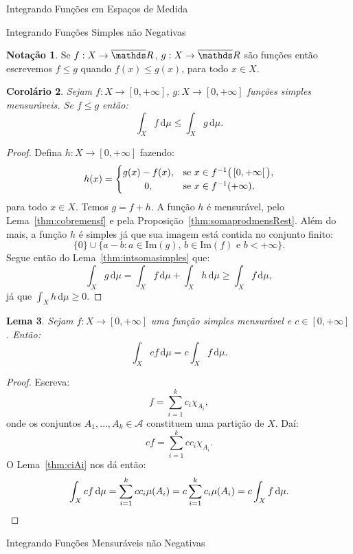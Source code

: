 \documentclass[oneside,final,11pt]{amsbook}
\newcommand{\R}{\mathds R}
\newcommand{\Img}{\mathrm{Im}}
\newcommand{\dd}{\mathrm d}
\theoremstyle{remark}\newtheorem{exercise}{Exercício}[chapter]
\theoremstyle{remark}\newtheorem{*exercise}[exercise]{\hbox to 0pt{\hskip 0pt minus 1fil*}Exercício}
\theoremstyle{definition}\newtheorem{exdefin}{Definição}[chapter]
\theoremstyle{plain}\newtheorem{teo}{Teorema}[section]
\theoremstyle{plain}\newtheorem{lem}[teo]{Lema}
\theoremstyle{plain}\newtheorem{prop}[teo]{Proposição}
\theoremstyle{plain}\newtheorem{cor}[teo]{Corolário}
\theoremstyle{definition}\newtheorem{defin}[teo]{Definição}
\theoremstyle{remark}\newtheorem{rem}[teo]{Observação}
\theoremstyle{definition}\newtheorem{notation}[teo]{Notação}
\theoremstyle{definition}\newtheorem{convention}[teo]{Convenção}
\theoremstyle{definition}\newtheorem{example}[teo]{Exemplo}
\numberwithin{section}{chapter}
\numberwithin{equation}{section}
\begin{document}
\begin{chapter}{Integrando Funções em Espaços de Medida}
\begin{section}{Integrando Funções Simples não Negativas}
\begin{notation}
Se $f:X\to\overline\R$, $g:X\to\overline\R$ são funções então escrevemos $f\le g$ quando
$f(x)\le g(x)$, para todo $x\in X$.
\end{notation}

\begin{cor}\label{thm:simplesfmenorg}
Sejam $f:X\to[0,+\infty]$, $g:X\to[0,+\infty]$ funções simples mensuráveis. Se
$f\le g$ então:
\[\int_Xf\,\dd\mu\le\int_Xg\,\dd\mu.\]
\end{cor}
\begin{proof}
Defina $h:X\to[0,+\infty]$ fazendo:
\[h(x)=\begin{cases}
g(x)-f(x),&\text{se $x\in f^{-1}\big(\left[0,+\infty\right[\big)$},\\
\hfil0,&\text{se $x\in f^{-1}(+\infty)$},
\end{cases}\]
para todo $x\in X$. Temos $g=f+h$. A função $h$ é mensurável, pelo Lema~\ref{thm:cobremensf}
e pela Proposição~\ref{thm:somaprodmensRest}. Além do mais, a função $h$ é simples já que sua
imagem está contida no conjunto finito:
\[\{0\}\cup\big\{a-b:\text{$a\in\Img(g)$, $b\in\Img(f)$ e $b<+\infty$}\big\}.\]
Segue então do Lema~\ref{thm:intsomasimples} que:
\[\int_Xg\,\dd\mu=\int_Xf\,\dd\mu+\int_Xh\,\dd\mu\ge\int_Xf\,\dd\mu,\]
já que $\int_Xh\,\dd\mu\ge0$.
\end{proof}

\begin{lem}\label{thm:cintsimples}
Sejam $f:X\to[0,+\infty]$ uma função simples mensurável e $c\in[0,+\infty]$. Então:
\[\int_Xcf\,\dd\mu=c\int_Xf\,\dd\mu.\]
\end{lem}
\begin{proof}
Escreva:
\[f=\sum_{i=1}^kc_i\chi_{A_i},\]
onde os conjuntos $A_1,\ldots,A_k\in\mathcal A$ constituem uma partição de $X$. Daí:
\[cf=\sum_{i=1}^kcc_i\chi_{A_i}.\]
O Lema~\ref{thm:ciAi} nos dá então:
\[\int_Xcf\,\dd\mu=\sum_{i=1}^kcc_i\mu(A_i)=c\sum_{i=1}^kc_i\mu(A_i)=c\int_Xf\,\dd\mu.\qedhere\]
\end{proof}

\end{section}

\begin{section}{Integrando Funções Mensuráveis não Negativas}
\label{sec:intmensnneg}


\end{section}
\end{chapter}
\end{document}
